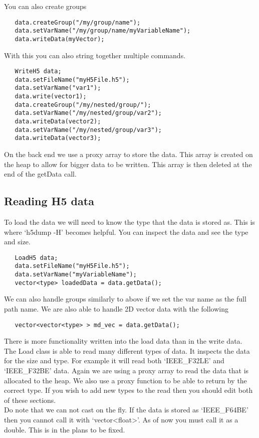 \documentclass[11pt]{article}
\begin{document}
You can also create groups

\begin{lstlisting}
   data.createGroup("/my/group/name");
   data.setVarName("/my/group/name/myVariableName");
   data.writeData(myVector);
\end{lstlisting}
With this you can also string together multiple commands.
\begin{lstlisting}
   WriteH5 data;
   data.setFileName("myH5File.h5");
   data.setVarName("var1");
   data.write(vector1);
   data.createGroup("/my/nested/group/");
   data.setVarName("/my/nested/group/var2");
   data.writeData(vector2);
   data.setVarName("/my/nested/group/var3");
   data.writeData(vector3);
\end{lstlisting}
On the back end we use a proxy array to store the data. This array is created on the 
heap to allow for bigger data to be written. This array is then deleted at the end
of the getData call.

\subsection{Reading H5 data}
To load the data we will need to know the type that the data is stored as. This is
where `h5dump -H' becomes helpful. You can inspect the data and see the type and size.
\begin{lstlisting}
   LoadH5 data;
   data.setFileName("myH5File.h5");
   data.setVarName("myVariableName");
   vector<type> loadedData = data.getData();
\end{lstlisting}
We can also handle groups similarly to above if we set the var name as the full path
name. We are also able to handle 2D vector data with the following
\begin{lstlisting}
   vector<vector<type> > md_vec = data.getData();
\end{lstlisting}
There is more functionality written into the load data than in the write data. The Load
class is able to read many different types of data. It inspects the data for the size 
and type. For example it will read both `IEEE\_F32LE' and `IEEE\_F32BE' data. Again
we are using a proxy array to read the data that is allocated to the heap. We also
use a proxy function to be able to return by the correct type. If you wish to add
new types to the read then you should edit both of these sections. 
\\
Do note that we can not cast on the fly. If the data is stored as `IEEE\_F64BE' then
you cannot call it with `vector<float>'. As of now you must call it as a double. This
is in the plans to be fixed.
\end{document}
